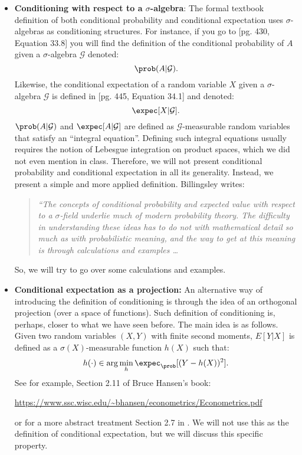 \documentclass[11pt]{article} %
\begin{document}
\begin{itemize}
\item \textbf{Conditioning with respect to a $\sigma$-algebra}: The formal textbook definition of both conditional probability and conditional expectation uses $\sigma$-algebras as conditioning structures. For instance, if you go to \cite{Billingsley95} [pg. 430, Equation 33.8] you will find the definition of the conditional probability of $A$ given a $\sigma$-algebra $\mathcal{G}$ denoted:
$$\prob(A | \mathcal{G}).$$ 
\noindent Likewise, the conditional expectation of a random variable $X$ given a $\sigma$-algebra $\mathcal{G}$ is defined in [pg. 445, Equation 34.1] and denoted:
$$\expec[X | \mathcal{G}].$$
\noindent $\prob(A | \mathcal{G})$ and $\expec[A | \mathcal{G}]$ are defined as $\mathcal{G}$-measurable random variables that satisfy an ``integral equation''. Defining such integral equations usually requires the notion of Lebesgue integration on product spaces, which we did not even mention in class. Therefore, we will not present conditional probability and conditional expectation in all its generality. Instead, we present a simple and more applied definition. Billingsley writes:
\begin{quote}
\emph{``The concepts of conditional probability and expected value with respect to a $\sigma$-field underlie much of modern probability theory. The difficulty in understanding these ideas has to do not with mathematical detail so much as with probabilistic meaning, and the way to get at this meaning is through calculations and examples \ldots }
\end{quote}
\noindent So, we will try to go over some calculations and examples. 

\item \textbf{Conditional expectation as a projection:} An alternative way of introducing the definition of conditioning is through the idea of an orthogonal projection (over a space of functions). Such definition of conditioning is, perhaps, closer to what we have seen before. The main idea is as follows. Given two random variables $(X,Y)$ with finite second moments, $E[Y|X]$ is defined as a $\sigma(X)$-measurable function $h(X)$ such that:
$$h(\cdot) \in \arg \min_{h} \expec_{\prob}[(Y-h(X))^2].$$ 
\noindent See for example, Section 2.11 of Bruce Hansen's book:
\begin{center}
\url{https://www.ssc.wisc.edu/~bhansen/econometrics/Econometrics.pdf}   
\end{center}
or for a more abstract treatment Section 2.7 in \cite{Brockwell_Davis:2013}. We will not use this as the definition of conditional expectation, but we will discuss this specific property. 
\end{itemize}
\end{document}
